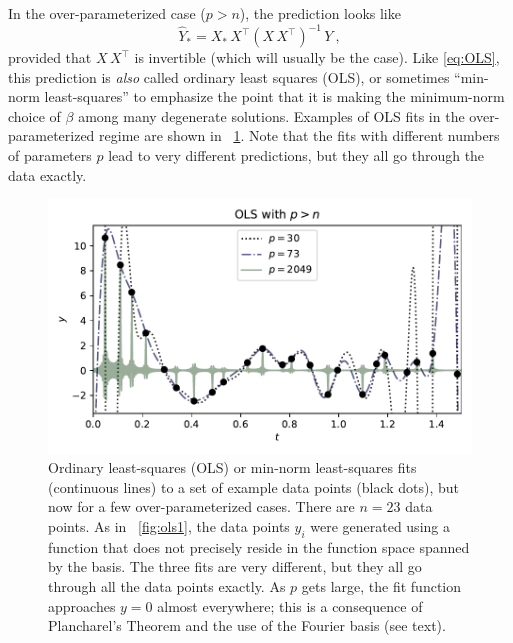 \documentclass[12pt,letterpaper]{article}
\newlength{\figurewidth}
\begin{document}
In the over-parameterized case ($p>n$), the prediction looks like
\begin{equation}\label{eq:OLS2}
    \hat{Y}_\ast = X_\ast\,X^\top (X\,X^\top)^{-1}\,Y
    ~,
\end{equation}
provided that $X\,X^\top$ is invertible (which will usually be the case).
Like \eqref{eq:OLS}, this prediction is \emph{also} called ordinary least squares (OLS), or sometimes ``min-norm least-squares'' to emphasize the point that it is making the minimum-norm choice of $\beta$ among many degenerate solutions.
Examples of OLS fits in the over-parameterized regime are shown in \figurename~\ref{fig:ols2}.
Note that the fits with different numbers of parameters $p$ lead to very different predictions, but they all go through the data exactly.
\begin{figure}[t]
    \begin{mdframed}
    \includegraphics[width=\figurewidth]{./OLS-over (1).pdf}
    \caption{Ordinary least-squares (OLS) or min-norm least-squares fits (continuous lines) to a set of example data points (black dots), but now for a few over-parameterized cases. There are $n=23$ data points. As in \figurename~\ref{fig:ols1}, the data points $y_i$ were generated using a function that does not precisely reside in the function space spanned by the basis. The three fits are very different, but they all go through all the data points exactly. As $p$ gets large, the fit function approaches $y=0$ almost everywhere; this is a consequence of Plancharel's Theorem and the use of the Fourier basis (see text).}
    \label{fig:ols2}
    \end{mdframed}
\end{figure}
\end{document}
